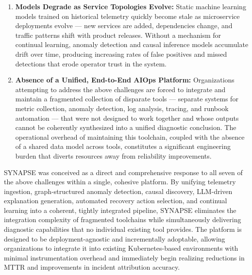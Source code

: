\begin{enumerate}
    \item \textbf{Models Degrade as Service Topologies Evolve:} Static machine learning models trained on historical telemetry quickly become stale as microservice deployments evolve — new services are added, dependencies change, and traffic patterns shift with product releases. Without a mechanism for continual learning, anomaly detection and causal inference models accumulate drift over time, producing increasing rates of false positives and missed detections that erode operator trust in the system.

    \item \textbf{Absence of a Unified, End-to-End AIOps Platform:} Organizations attempting to address the above challenges are forced to integrate and maintain a fragmented collection of disparate tools — separate systems for metric collection, anomaly detection, log analysis, tracing, and runbook automation — that were not designed to work together and whose outputs cannot be coherently synthesized into a unified diagnostic conclusion. The operational overhead of maintaining this toolchain, coupled with the absence of a shared data model across tools, constitutes a significant engineering burden that diverts resources away from reliability improvements.
\end{enumerate}

\hspace*{0.3in} SYNAPSE was conceived as a direct and comprehensive response to all seven of the above challenges within a single, cohesive platform. By unifying telemetry ingestion, graph-structured anomaly detection, causal discovery, LLM-driven explanation generation, automated recovery action selection, and continual learning into a coherent, tightly integrated pipeline, SYNAPSE eliminates the integration complexity of fragmented toolchains while simultaneously delivering diagnostic capabilities that no individual existing tool provides. The platform is designed to be deployment-agnostic and incrementally adoptable, allowing organizations to integrate it into existing Kubernetes-based environments with minimal instrumentation overhead and immediately begin realizing reductions in MTTR and improvements in incident attribution accuracy.\\\\
